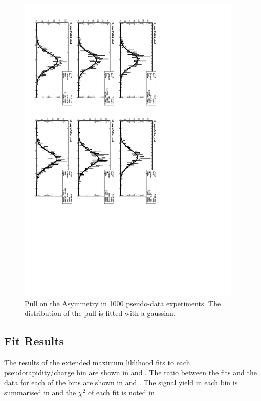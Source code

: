\begin{figure}[htbp]
  \begin{center}
\includegraphics*[angle=90,width=0.95\textwidth]{pullasyTot.pdf}
    \caption{\label{fig:toyasym_pull}Pull on the Asymmetry in 1000 pseudo-data experiments. The distribution of the pull is fitted with a gaussian.}
  \end{center}
\end{figure}

\subsection{Fit Results}

The results of the extended maximum liklihood fits to each pseudorapidity/charge
bin are shown in  and .
The ratio between the fits and the data for each of the 
bins are shown in  and .
The signal yield in each bin is summarised in  and the
$\chi^2$ of each fit is noted in .

